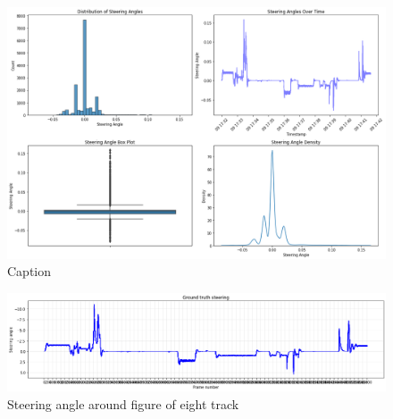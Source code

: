 \begin{figure}
    \centering
    \includegraphics[width=0.99\linewidth]{Figures/Methods/Steering-Angle-Data-Town04-commit-04e147a.png}
    \caption{Caption}
    \label{fig:Steering-Angle-Data-Town04-commit-04e147a}
\end{figure}

\begin{figure}
    \centering
    \includegraphics[width=0.99\linewidth]{Figures/Methods/Steering-Angle-2-Data-Town04-commit-ab3363b.png}
    \caption{Steering angle around figure of eight track}
    \label{fig:Steering-Angle-2-Data-Town04-commit-ab3363b.png}
\end{figure}



